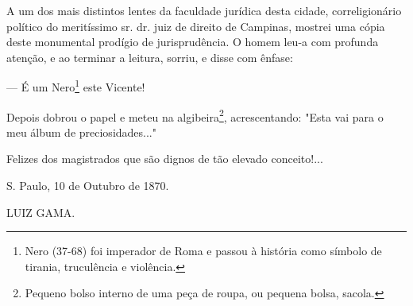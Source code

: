 A um dos mais distintos lentes da faculdade jurídica desta cidade,
correligionário político do meritíssimo sr. dr. juiz de direito de
Campinas, mostrei uma cópia deste monumental prodígio de jurisprudência.
O homem leu-a com profunda atenção, e ao terminar a leitura, sorriu, e
disse com ênfase:

--- É um Nero\footnote{Nero (37-68) foi imperador de Roma e passou à
  história como símbolo de tirania, truculência e violência.} este
Vicente!

Depois dobrou o papel e meteu na algibeira\footnote{Pequeno bolso
  interno de uma peça de roupa, ou pequena bolsa, sacola.},
acrescentando: "Esta vai
para o meu álbum de preciosidades..."

Felizes dos magistrados que são dignos de tão elevado conceito!...

S. Paulo, 10 de Outubro de 1870.

LUIZ GAMA.

\pagebreak
\mbox{}\vfill
\thispagestyle{empty}

